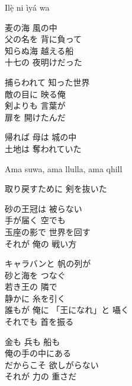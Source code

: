\begin{lyrics}
Ilẹ̀ ni ìyá wa

\begin{japanese}
麦の海 風の中\\
父の名を 背に負って\\
知らぬ海 越える船\\
十七の 夜明けだった

捕らわれて 知った世界\\
敵の目に 映る俺\\
剣よりも 言葉が\\
扉を 開けたんだ
\end{japanese}

\begin{japanese}
帰れば 母は 城の中\\
土地は 奪われていた\\
\end{japanese}
Ama suwa, ama llulla, ama qhill\\
\begin{japanese}
取り戻すために 剣を抜いた
\end{japanese}

\begin{japanese}
砂の王冠は 被らない\\
手が届く 空でも\\
玉座の影で 世界を回す\\
それが 俺の 戦い方
\end{japanese}

\begin{japanese}
キャラバンと 帆の列が\\
砂と海を つなぐ\\
若き王の 隣で\\
静かに 糸を引く\\
誰もが 俺に 「王になれ」と 囁く\\
それでも 首を振る
\end{japanese}

\begin{japanese}
金も 兵も 船も\\
俺の手の中にある\\
だからこそ 欲しがらない\\
それが 力の 重さだ
\end{japanese}


\end{lyrics}
